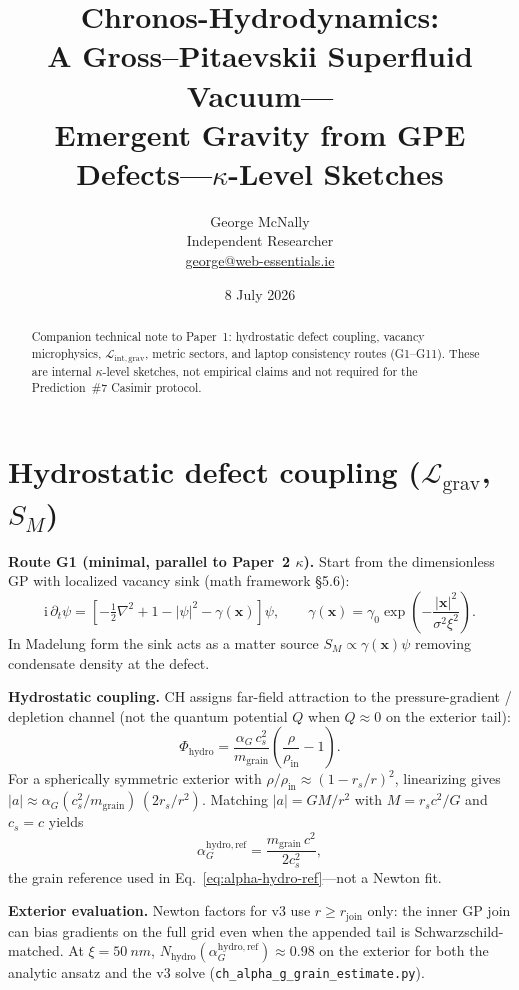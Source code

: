 \documentclass[11pt,a4paper]{article}
\title{%
  Chronos-Hydrodynamics:\\
  A Gross--Pitaevskii Superfluid Vacuum---\\
  Emergent Gravity from GPE Defects---$\kappa$-Level Sketches%
}
\author{%
  George McNally\\[0.25em]
  \small Independent Researcher\\[0.15em]
  \small \href{mailto:george@web-essentials.ie}{george@web-essentials.ie}%
}
\date{8 July 2026}
\begin{document}
\maketitle
\begin{abstract}
Companion technical note to Paper~1: hydrostatic defect coupling, vacancy microphysics,
$\mathcal{L}_{\mathrm{int,grav}}$, metric sectors, and laptop consistency routes (G1--G11).
These are internal $\kappa$-level sketches, not empirical claims and not required for the
Prediction~\#7 Casimir protocol.
\end{abstract}
\section{Hydrostatic defect coupling \texorpdfstring{($\mathcal{L}_{\mathrm{grav}}$, $S_M$)}{(L\_grav, S\_M)}}
\label{app:lgrav}

\textbf{Route G1 (minimal, parallel to Paper~2 $\kappa$).}
Start from the dimensionless GP with localized vacancy sink (math framework \S5.6):
\begin{equation}
  \mathrm{i}\,\partial_t \psi = \left[-\tfrac{1}{2}\nabla^2 + 1 - |\psi|^2 - \gamma(\mathbf{x})\right]\psi,
  \qquad
  \gamma(\mathbf{x}) = \gamma_0 \exp\!\left(-\frac{|\mathbf{x}|^2}{\sigma^2 \xi^2}\right).
  \label{eq:app-sm-sink}
\end{equation}
In Madelung form the sink acts as a matter source $S_M \propto \gamma(\mathbf{x})\psi$ removing condensate density at the defect.

\textbf{Hydrostatic coupling.}
CH assigns far-field attraction to the pressure-gradient / depletion channel (not the quantum potential $Q$ when $Q \approx 0$ on the exterior tail):
\begin{equation}
  \Phi_{\mathrm{hydro}} = \frac{\alpha_G\, c_s^2}{m_{\mathrm{grain}}}\left(\frac{\rho}{\rho_{\mathrm{in}}} - 1\right).
  \label{eq:app-phi-hydro}
\end{equation}
For a spherically symmetric exterior with $\rho/\rho_{\mathrm{in}} \approx (1 - r_s/r)^2$, linearizing gives $|a| \approx \alpha_G (c_s^2/m_{\mathrm{grain}})\,(2 r_s/r^2)$.
Matching $|a| = GM/r^2$ with $M = r_s c^2/G$ and $c_s = c$ yields
\begin{equation}
  \alpha_G^{\mathrm{hydro,ref}} = \frac{m_{\mathrm{grain}}\, c^2}{2 c_s^2},
  \label{eq:app-alpha-ref}
\end{equation}
the grain reference used in Eq.~\ref{eq:alpha-hydro-ref}---not a Newton fit.

\textbf{Exterior evaluation.}
Newton factors for v3 use $r \geq r_{\mathrm{join}}$ only: the inner GP join can bias gradients on the full grid even when the appended tail is Schwarzschild-matched.
At $\xi = \SI{50}{nm}$, $N_{\mathrm{hydro}}(\alpha_G^{\mathrm{hydro,ref}}) \approx 0.98$ on the exterior for both the analytic ansatz and the v3 solve (\texttt{ch\_alpha\_g\_grain\_estimate.py}).
\end{document}
